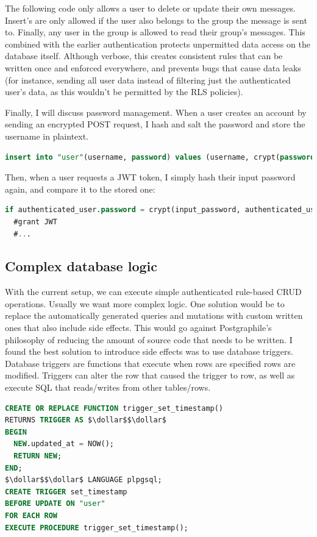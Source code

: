 \documentclass{l4proj}
\begin{document}
The following code only allows a user to delete or update their own messages. Insert's are only allowed if the user also belongs to the group the message is sent to. Finally, any user in the group is allowed to read their group's messages. This combined with the earlier authentication protects unpermitted data access on the database itself. Although verbose, this creates consistent rules that can be written once and enforced everywhere, and prevents bugs that cause data leaks (for instance, sending all user data instead of filtering just the authenticated user's data, as this wouldn't be permitted by the RLS policies).

Finally, I will discuss password management. When a user creates an account by sending an encrypted POST request, I hash and salt the password and store the username in plaintext.

\begin{lstlisting}[language=SQL, caption={Hashing and salting done with pgcrypto}, label=lst:callahan]
insert into "user"(username, password) values (username, crypt(password, gen_salt('bf')));
\end{lstlisting}

Then, when a user requests a JWT token, I simply hash their input password again, and compare it to the stored one:
\begin{lstlisting}[language=SQL, caption={Hashing and salting done with pgcrypto}, label=lst:callahan]
if authenticated_user.password = crypt(input_password, authenticated_user.password) then
  #grant JWT
  #...
\end{lstlisting}

\subsection{Complex database logic}
With the current setup, we can execute simple authenticated rule-based CRUD operations. Usually we want more complex logic. One solution would be to replace the automatically generated queries and mutations with custom written ones that also include side effects. This would go against Postgraphile's philosophy of reducing the amount of source code that needs to be written. I found the best solution to introduce side effects was to use database triggers. Database triggers are functions that execute when rows are specified rows are modified. Triggers can alter the row that caused the trigger to row, as well as execute SQL that reads/writes from other tables/rows. 


\begin{lstlisting}[language=SQL, caption={Definition of a trigger function which sets the rows' "updated\_at" column to be the current time, and a trigger which calls the function on a user whenever the user is updated.}, label=lst:callahan]
CREATE OR REPLACE FUNCTION trigger_set_timestamp()
RETURNS TRIGGER AS $\dollar$$\dollar$ 
BEGIN
  NEW.updated_at = NOW();
  RETURN NEW;
END;
$\dollar$$\dollar$ LANGUAGE plpgsql;
CREATE TRIGGER set_timestamp
BEFORE UPDATE ON "user"
FOR EACH ROW
EXECUTE PROCEDURE trigger_set_timestamp();
\end{lstlisting}
\end{document}
